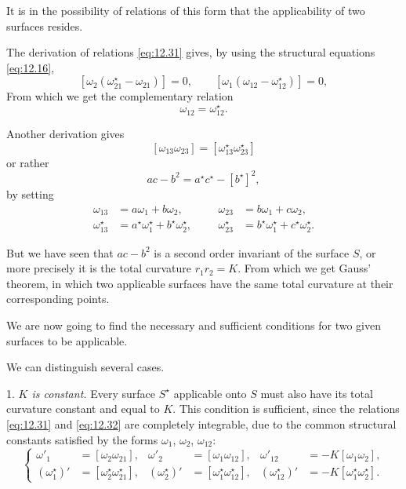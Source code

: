 \documentclass[leqno,11pt]{book}
\numberwithin{equation}{chapter}
\theoremstyle{shape1}
\theoremstyle{shapesmall}
\newcommand{\str}{^{\star}}
\newcommand{\somespace}{\vspace{9pt}}
\begin{document}
It is in the possibility of relations of this form that the applicability of two surfaces resides.

The derivation of relations \eqref{eq:12.31} gives, by using the structural equations \eqref{eq:12.16},
\[
[\omega_{2}(\omega_{21}\str-\omega_{21})]=0,\qquad[\omega_{1}(\omega_{12}-\omega_{12}\str)]=0,
\]
From which we get the complementary relation
\begin{equation}
  \label{eq:12.32}
  \omega_{12}=\omega_{12}\str.
\end{equation}

Another derivation gives
\[
[\omega_{13}\omega_{23}]=[\omega_{13}\str\omega_{23}\str]
\]
or rather
\[
ac-b^{2}=a\str c\str-[b\str]^{2},
\]
by setting
\[
\begin{aligned}
  \omega_{13}&=a\omega_{1}+b\omega_{2},&&&\omega_{23}&=b\omega_{1}+c\omega_{2},\\
  \omega\str_{13}&=a\str\omega\str_{1}+b\str\omega\str_{2},&&&\omega\str_{23}&=b\str\omega\str_{1}+c\str\omega\str_{2}.
\end{aligned}
\]

But we have seen that $ac-b^{2}$ is a second order invariant of the surface $S$, or more precisely it is the total curvature $r_{1}r_{2}=K$. From which we get Gauss' theorem, in which two applicable surfaces have the same total curvature at their corresponding points.

We are now going to find the necessary and sufficient conditions for two given surfaces to be applicable.

We can distinguish several cases.

\somespace

1. \emph{$K$ is constant.}
Every surface $S\str$ applicable onto $S$ must also have its total curvature constant and equal to $K$. This condition is sufficient, since the relations \eqref{eq:12.31} and \eqref{eq:12.32} are completely integrable, due to the common structural constants satisfied by the forms $\omega_{1}$, $\omega_{2}$, $\omega_{12}$:
\begin{equation}
  \label{eq:12.33}
  \left\{
    \begin{aligned}
      \omega'_{1}&=[\omega_{2}\omega_{21}],&\omega'_{2}&=[\omega_{1}\omega_{12}],&\omega'_{12}&=-K[\omega_{1}\omega_{2}],\\
      (\omega\str_{1})'&=[\omega\str_{2}\omega\str_{21}],&(\omega\str_{2})'&=[\omega\str_{1}\omega\str_{12}],&(\omega\str_{12})'&=-K[\omega\str_{1}\omega\str_{2}].
    \end{aligned}
  \right.
\end{equation}
\end{document}
